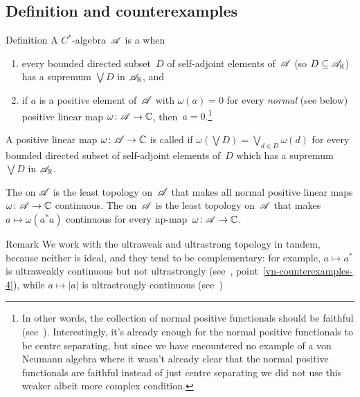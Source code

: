 \documentclass[a]{subfiles}
\begin{document}
\subsection{Definition and counterexamples}
\begin{parsec}[vna]%
\begin{point}{Definition}%
A $C^*$-algebra~$\mathscr{A}$
is a 
when
\begin{enumerate}
\item
every bounded directed subset~$D$
of self-adjoint elements of~$\mathscr{A}$ (so $D\subseteq \mathscr{A}_{\mathbb{R}}$) 
has a supremum $\bigvee D$ in $\mathscr{A}_{\mathbb{R}}$, and
\item
if $a$ is a positive element of~$\mathscr{A}$
with $\omega(a)=0$ for every \emph{normal} (see below) positive 
linear map $\omega\colon \mathscr{A}\to \mathbb{C}$,
then~$a=0$.\footnote{In other words,
the collection of normal positive functionals should be faithful
(see~).
Interestingly,
it's already enough for the normal positive 
functionals to be centre separating,
but since we have encountered no example
of a von Neumann algebra
where it wasn't already clear that the normal positive 
functionals are faithful
instead of just centre separating
we did not use this weaker albeit more complex condition.}
\end{enumerate}
\begin{point}%
A positive linear map $\omega\colon \mathscr{A}\to \mathbb{C}$
is called 
if $\omega(\bigvee D) = \bigvee_{d\in D} \omega(d)$
for every bounded directed subset of self-adjoint elements of~$D$
which has a supremum $\bigvee D$ in $\mathscr{A}_{\mathbb{R}}$.
\end{point}%
\begin{point}%
The  on $\mathscr{A}$
is the least topology on~$\mathscr{A}$
that makes all normal positive linear maps $\omega\colon \mathscr{A}\to \mathbb{C}$
continuous.
The  on~$\mathscr{A}$
is the least topology on~$\mathscr{A}$
that makes $a\mapsto \omega(a^*a)$ continuous
for every np-map~$\omega\colon \mathscr{A}\to \mathbb{C}$.
\end{point}
\end{point}
\begin{point}{Remark}%
We work with the ultraweak and ultrastrong topology in tandem,
because neither is ideal, and they tend to be complementary:
for example, $a\mapsto a^*$ is ultraweakly continuous
but not ultrastrongly (see~,
point~\ref{vn-counterexamples-4}), 
while $a\mapsto \left|a\right|$
is ultrastrongly continuous (see~)

\end{point}
\end{parsec}
\end{document}
